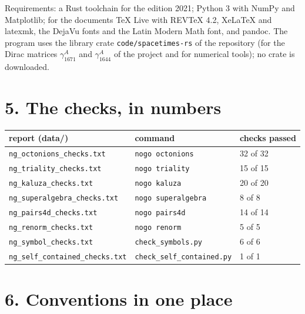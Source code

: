\documentclass[
  10pt,
]{article}
\begin{document}
Requirements: a Rust toolchain for the edition 2021; Python 3 with NumPy
and Matplotlib; for the documents TeX Live with REVTeX 4.2, XeLaTeX and
latexmk, the DejaVu fonts and the Latin Modern Math font, and pandoc.
The program uses the library crate \texttt{code/spacetimes-rs} of the
repository (for the Dirac matrices \(\gamma^A_{1671}\) and
\(\gamma^A_{1644}\) of the project and for numerical tools); no crate is
downloaded.

\hypertarget{the-checks-in-numbers}{%
\section{5. The checks, in numbers}\label{the-checks-in-numbers}}

\begin{longtable}[]{@{}lll@{}}
\toprule\noalign{}
report (data/) & command & checks passed \\
\midrule\noalign{}
\endhead
\bottomrule\noalign{}
\endlastfoot
\texttt{ng\_octonions\_checks.txt} & \texttt{nogo\ octonions} & 32 of
32 \\
\texttt{ng\_triality\_checks.txt} & \texttt{nogo\ triality} & 15 of
15 \\
\texttt{ng\_kaluza\_checks.txt} & \texttt{nogo\ kaluza} & 20 of 20 \\
\texttt{ng\_superalgebra\_checks.txt} & \texttt{nogo\ superalgebra} & 8
of 8 \\
\texttt{ng\_pairs4d\_checks.txt} & \texttt{nogo\ pairs4d} & 14 of 14 \\
\texttt{ng\_renorm\_checks.txt} & \texttt{nogo\ renorm} & 5 of 5 \\
\texttt{ng\_symbol\_checks.txt} & \texttt{check\_symbols.py} & 6 of 6 \\
\texttt{ng\_self\_contained\_checks.txt} &
\texttt{check\_self\_contained.py} & 1 of 1 \\
\end{longtable}

\hypertarget{conventions-in-one-place}{%
\section{6. Conventions in one place}\label{conventions-in-one-place}}
\end{document}
